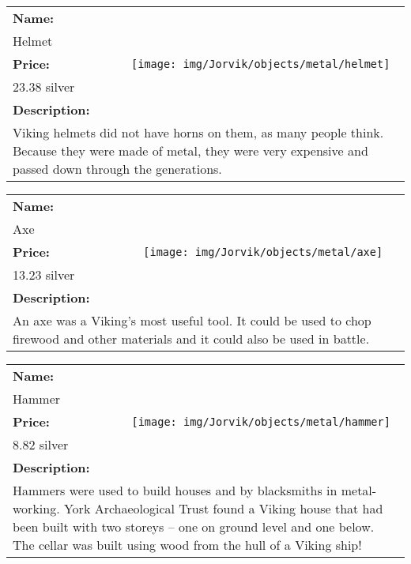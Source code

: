 \begin{table}[ht!]
	\centering
	\begin{tabular}{ p{3cm} c }\toprule
		\textbf{Name:} & \multirow{5}{*}{\texttt{[image: img/Jorvik/objects/metal/helmet]}}\\
		Helmet & \\ 
		\textbf{Price:} & \\
		23.38 silver & \\ 
		\textbf{Description:} & \\
		\multicolumn{2}{p{12cm}}{Viking helmets did not have horns on them, as many people think. Because they were made of metal, they were very expensive and passed down through the generations.}\\
		\bottomrule
	\end{tabular}
\end{table}

\begin{table}[ht!]
	\centering
	\begin{tabular}{ p{3cm} c }\toprule
		\textbf{Name:} & \multirow{5}{*}{\texttt{[image: img/Jorvik/objects/metal/axe]}}\\
		Axe & \\ 
		\textbf{Price:} & \\
		13.23 silver & \\ 
		\textbf{Description:} & \\
		\multicolumn{2}{p{12cm}}{An axe was a Viking's most useful tool. It could be used to chop firewood and other materials and it could also be used in battle.}\\
		\bottomrule
	\end{tabular}
\end{table}

\begin{table}[ht!]
	\centering
	\begin{tabular}{ p{3cm} c }\toprule
		\textbf{Name:} & \multirow{5}{*}{\texttt{[image: img/Jorvik/objects/metal/hammer]}}\\
		Hammer & \\ 
		\textbf{Price:} & \\
		8.82 silver & \\ 
		\textbf{Description:} & \\
		\multicolumn{2}{p{12cm}}{Hammers were used to build houses and by blacksmiths in metal-working. York Archaeological Trust found a Viking house that had been built with two storeys – one on ground level and one below. The cellar was built using wood from the hull of a Viking ship!}\\
		\bottomrule
	\end{tabular}
\end{table}

